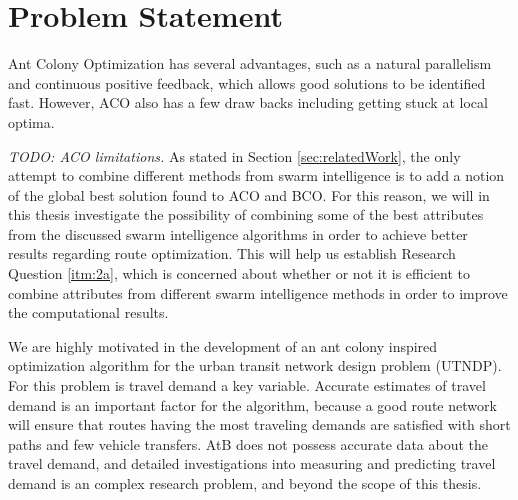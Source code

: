 \section{Problem Statement}

Ant Colony Optimization has several advantages, such as a natural parallelism and continuous positive feedback, which allows good solutions to be identified fast. However, ACO also has a few draw backs including getting stuck at local optima. 

\emph{\color{blue}TODO: ACO limitations.} As stated in Section \vref{sec:relatedWork}, the only attempt to combine different methods from swarm intelligence is to add a notion of the global best solution found to ACO and BCO. For this reason, we will in this thesis investigate the possibility of combining some of the best attributes from the discussed swarm intelligence algorithms in order to achieve better results regarding route optimization. This will help us establish Research Question \vref{itm:2a}, which is concerned about whether or not it is efficient to combine attributes from different swarm intelligence methods in order to improve the computational results.

We are highly motivated in the development of an ant colony inspired optimization algorithm for the urban transit network design problem (UTNDP). For this problem is travel demand a key variable. Accurate estimates of travel demand is an important factor for the algorithm, because a good route network will ensure that routes having the most traveling demands are satisfied with short paths and few vehicle transfers. AtB does not possess accurate data about the travel demand, and detailed investigations into measuring and predicting travel demand is an complex research problem, and beyond the scope of this thesis. 

